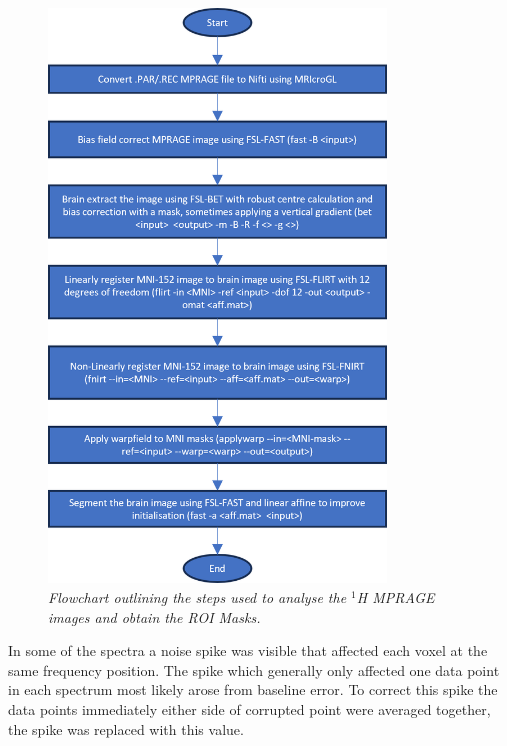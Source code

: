 \begin{figure}
    \centering
    \includegraphics[width = 0.8\textwidth]{Figures/Glucose/Flow_Image.png}
    \caption{\textit{Flowchart outlining the steps used to analyse the $^1$H MPRAGE images and obtain the \ac{ROI} Masks.}}
    \label{fig:Glu:1H_Flow}
\end{figure}

In some of the spectra a noise spike was visible that affected each voxel at the same frequency position. The spike which generally only affected one data point in each spectrum most likely arose from baseline error. To correct this spike the data points immediately either side of corrupted point were averaged together, the spike was replaced with this value. 

